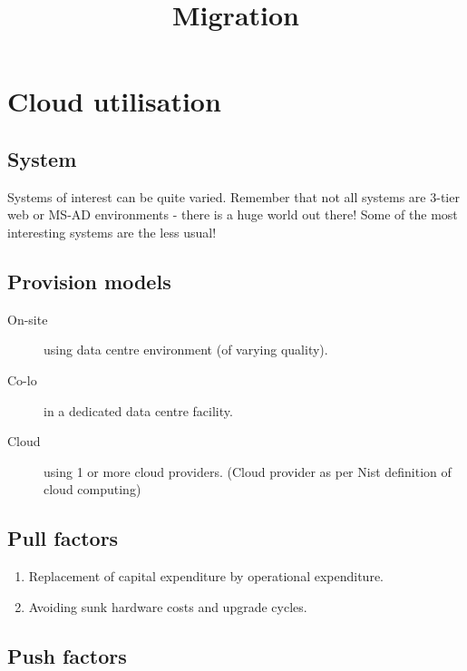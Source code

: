 \documentclass[slides]{pgnotes}
\title{Migration}
\begin{document}
\maketitle

\tableofcontents

\section{Cloud utilisation}\label{cloud-utilisation}

\subsection{System}\label{system}

Systems of interest can be quite varied. Remember that not all systems
are 3-tier web or MS-AD environments - there is a huge world out there!
Some of the most interesting systems are the less usual!

\subsection{Provision models}\label{provision-models}

\begin{description}
\item[On-site]
using data centre environment (of varying quality).
\item[Co-lo]
in a dedicated data centre facility.
\item[Cloud]
using 1 or more cloud providers. (Cloud provider as per Nist definition
of cloud computing)
\end{description}

\subsection{Pull factors}\label{pull-factors}

\begin{enumerate}
\def\labelenumi{\arabic{enumi}.}
\item
  Replacement of capital expenditure by operational expenditure.
\item
  Avoiding sunk hardware costs and upgrade cycles.
\end{enumerate}

\subsection{Push factors}\label{push-factors}
\end{document}
